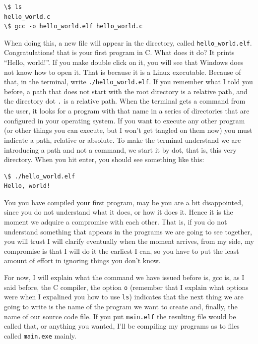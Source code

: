 \documentclass[a4paper]{article}
\begin{document}
\noindent
\begin{minipage}[H]{\linewidth}
\mbox{}
\begin{lstlisting}[style=terminalStyle]
\$ ls
hello_world.c
\$ gcc -o hello_world.elf hello_world.c
\end{lstlisting}
\end{minipage}

When doing this, a new file will appear in the directory, called
\verb!hello_world.elf!. Congratulations! that is your first program in C. What
does it do? It prints ``Hello, world!''. If you make double click on it, you
will see that Windows does not know how to open it. That is because it is a
Linux executable. Because of that, in the terminal, write
\verb!./hello_world.elf!. If you remember what I told you before, a path that
does not start with the root directory is a relative path, and the directory
dot \verb!.! is a relative path. When the terminal gets a command from the user,
it looks for a program with that name in a series of directories that are
configured in your operating system. If you want to execute any other program
(or other things you can execute, but I won't get tangled on them now) you must
indicate a path, relative or absolute. To make the terminal understand we are
introducing a path and not a command, we start it by dot, that is, this very
directory. When you hit enter, you should see something like this:

\noindent
\begin{minipage}[H]{\linewidth}
\mbox{}
\begin{lstlisting}[style=terminalStyle]
\$ ./hello_world.elf
Hello, world!
\end{lstlisting}
\end{minipage}

You you have compiled your first program, may be you are a bit disappointed,
since you do not understand what it does, or how it does it. Hence it is the
moment we adquire a compromise with each other. That is, if you do not
understand something that appears in the programs we are going to see together,
you will trust I will clarify eventually when the moment arrives, from my side,
my compromise is that I will do it the earliest I can, so you have to put the
least amount of effort in ignoring things you don't know.

For now, I will explain what the command we have issued before is, gcc is, as
I said before, the C compiler, the option \verb!o! (remember that I explain
what options were when I expalined you how to use \verb!ls!) indicates that the
next thing we are going to write is the name of the program we want to create
and, finally, the name of our source code file. If you put \verb!main.elf! the
resulting file would be called that, or anything you wanted, I'll be compiling
my programs as to files called \verb!main.exe! mainly.
\end{document}
